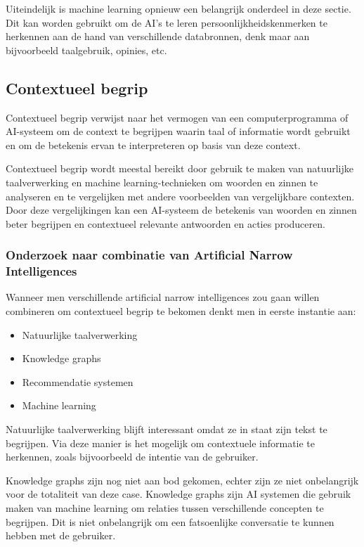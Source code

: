Uiteindelijk is machine learning opnieuw een belangrijk onderdeel in deze sectie. Dit kan worden gebruikt om de AI's te leren persoonlijkheidskenmerken te herkennen aan de hand van verschillende databronnen, denk maar aan bijvoorbeeld taalgebruik, opinies, etc.

\subsection{Contextueel begrip}

Contextueel begrip verwijst naar het vermogen van een computerprogramma of AI-systeem om de context te begrijpen waarin taal of informatie wordt gebruikt en om de betekenis ervan te interpreteren op basis van deze context.

Contextueel begrip wordt meestal bereikt door gebruik te maken van natuurlijke taalverwerking en machine learning-technieken om woorden en zinnen te analyseren en te vergelijken met andere voorbeelden van vergelijkbare contexten. Door deze vergelijkingen kan een AI-systeem de betekenis van woorden en zinnen beter begrijpen en contextueel relevante antwoorden en acties produceren.

\subsubsection{Onderzoek naar combinatie van Artificial Narrow Intelligences}

Wanneer men verschillende artificial narrow intelligences zou gaan willen combineren om contextueel begrip te bekomen denkt men in eerste instantie aan:

\begin{itemize}
    \item Natuurlijke taalverwerking
    \item Knowledge graphs
    \item Recommendatie systemen
    \item Machine learning
\end{itemize}

Natuurlijke taalverwerking blijft interessant omdat ze in staat zijn tekst te begrijpen. Via deze manier is het mogelijk om contextuele informatie te herkennen, zoals bijvoorbeeld de intentie van de gebruiker.

Knowledge graphs zijn nog niet aan bod gekomen, echter zijn ze niet onbelangrijk voor de totaliteit van deze case. Knowledge graphs zijn AI systemen die gebruik maken van machine learning om relaties tussen verschillende concepten te begrijpen. Dit is niet onbelangrijk om een fatsoenlijke conversatie te kunnen hebben met de gebruiker.

